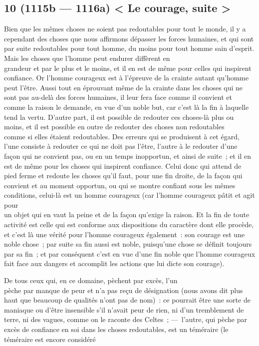 \documentclass[french,twoside]{book} %
\begin{document}
\subsection[{10 (1115b — 1116a) < Le courage, suite >}]{10 (1115b — 1116a) < Le courage, suite >}
\noindent Bien que les mêmes choses ne soient pas redoutables pour tout le monde, il y a cependant des choses que nous affirmons dépasser les forces humaines, et qui sont par suite redoutables pour tout homme, du moins pour tout homme sain d’esprit. Mais les choses que l’homme peut endurer diffèrent en \\
grandeur et par le plus et le moins, et il en est de même pour celles qui inspirent confiance. Or l’homme courageux est à l’épreuve de la crainte autant qu’homme peut l’être. Aussi tout en éprouvant même de la crainte dans les choses qui ne sont pas au-delà des forces humaines, il leur fera face comme il convient et comme la raison le demande, en vue d’un noble but, car c’est là la fin à laquelle tend la vertu. D’autre part, il est possible de redouter ces choses-là plus ou moins, et il est possible en outre de redouter des choses non redoutables \\
comme si elles étaient redoutables. Des erreurs qui se produisent à cet égard, l’une consiste à redouter ce qui ne doit pas l’être, l’autre à le redouter d’une façon qui ne convient pas, ou en un temps inopportun, et ainsi de suite ; et il en est de même pour les choses qui inspirent confiance. Celui donc qui attend de pied ferme et redoute les choses qu’il faut, pour une fin droite, de la façon qui convient et au moment opportun, ou qui se montre confiant sous les mêmes conditions, celui-là est un homme courageux (car l’homme courageux pâtit et agit pour \\
un objet qui en vaut la peine et de la façon qu’exige la raison. Et la fin de toute activité est celle qui est conforme aux dispositions du caractère dont elle procède, et c’est là une vérité pour l’homme courageux également : son courage est une noble chose ; par suite sa fin aussi est noble, puisqu’une chose se définit toujours par sa fin ; et par conséquent c’est en vue d’une fin noble que l’homme courageux fait face aux dangers et accomplit les actions que lui dicte son courage).\par
De tous ceux qui, en ce domaine, pèchent par excès, l’un \\
pèche par manque de peur et n’a pas reçu de désignation (nous avons dit plus haut que beaucoup de qualités n’ont pas de nom) : ce pourrait être une sorte de maniaque ou d’être insensible s’il n’avait peur de rien, ni d’un tremblement de terre, ni des vagues, comme on le raconte des Celtes ; — l’autre, qui pèche par excès de confiance en soi dans les choses redoutables, est un téméraire (le téméraire est encore considéré \\
\end{document}
